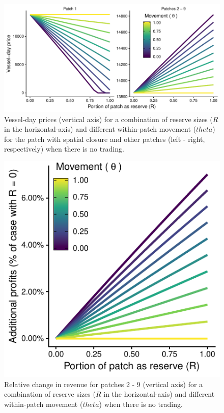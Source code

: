 \documentclass[12pt]{article}
\begin{document}
\begin{figure}[htbp]
\centering
\includegraphics{img/vessel_day_price_no_trading_plot.pdf}
\caption{\label{fig:vessel_day_price_no_trading_plot}Vessel-day prices (vertical axis) for a combination of reserve sizes ($R$ in the horizontal-axis) and different within-patch movement ($theta$) for the patch with spatial closure and other patches (left - right, respectively) when there is no trading.}
\end{figure}

\begin{figure}[htbp]
\centering
\includegraphics{img/profits_PNA_notKIR_no_trading_plot.pdf}
\caption{\label{fig:profits_PNA_notKIR_no_trading_plot}Relative change in revenue for patches 2 - 9 (vertical axis) for a combination of reserve sizes ($R$ in the horizontal-axis) and different within-patch movement ($theta$) when there is no trading.}
\end{figure}
\end{document}
